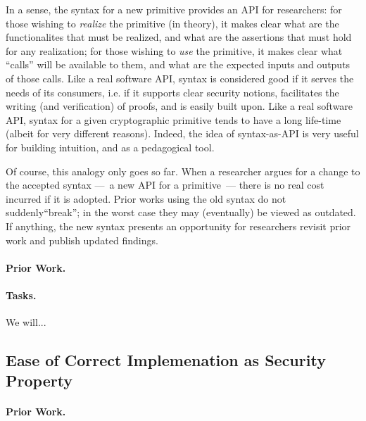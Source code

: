 {In a sense, the syntax for a new primitive provides an API for researchers: for those wishing to \emph{realize} the primitive (in theory), it makes clear what are the functionalites that must be realized, and what are the assertions that must hold for any realization; for those wishing to \emph{use} the primitive, it makes clear what ``calls'' will be available to them, and what are the expected inputs and outputs of those calls.  
%
Like a real software API, syntax is considered good if it serves the needs of its consumers, i.e. if it supports clear security notions, facilitates the writing (and verification) of proofs, and is easily built upon.  
%
Like a real software API, syntax for a given cryptographic primitive tends to have a long life-time (albeit for very different reasons).
Indeed, the idea of syntax-as-API is very useful for building intuition, and as a pedagogical tool.  
%

Of course, this analogy only goes so far.  When a researcher argues for a change to the accepted syntax ---~a new API for a primitive~--- there is no real cost incurred if it is adopted.  Prior works using the old syntax do not suddenly``break''; in the worst case they may (eventually) be viewed as outdated.  If anything, the new syntax presents an opportunity for researchers revisit prior work and publish updated findings.  

\paragraph{Prior Work.} 

\paragraph{Tasks.}
We will...

\subsection{Ease of Correct Implemenation as Security Property}

\paragraph{Prior Work.}  

}
